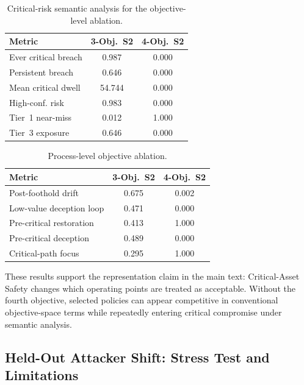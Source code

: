 \documentclass[sigconf,review,anonymous]{acmart}
\begin{document}
\begin{table}[!htbp]
\centering
\caption{Critical-risk semantic analysis for the objective-level ablation.}
\label{tab:app-rq4-objective-semantic-analysis}
\begingroup
\small
\setlength{\tabcolsep}{3pt}
\renewcommand{\arraystretch}{1.10}
\begin{tabular*}{\columnwidth}{@{\extracolsep{\fill}}lcc@{}}
\toprule
Metric & 3-Obj.~S2 & 4-Obj.~S2 \\
\midrule
Ever critical breach & 0.987 & 0.000 \\
Persistent breach & 0.646 & 0.000 \\
Mean critical dwell & 54.744 & 0.000 \\
High-conf. risk & 0.983 & 0.000 \\
Tier~1 near-miss & 0.012 & 1.000 \\
Tier~3 exposure & 0.646 & 0.000 \\
\bottomrule
\end{tabular*}
\endgroup
\end{table}

\begin{table}[!htbp]
\centering
\caption{Process-level objective ablation.}
\label{tab:app-rq4-objective-process-analysis}
\begingroup
\small
\setlength{\tabcolsep}{4pt}
\renewcommand{\arraystretch}{1.10}
\begin{tabular*}{\columnwidth}{@{\extracolsep{\fill}}lcc@{}}
\toprule
Metric & 3-Obj.~S2 & 4-Obj.~S2 \\
\midrule
Post-foothold drift & 0.675 & 0.002 \\
Low-value deception loop & 0.471 & 0.000 \\
Pre-critical restoration & 0.413 & 1.000 \\
Pre-critical deception & 0.489 & 0.000 \\
Critical-path focus & 0.295 & 1.000 \\
\bottomrule
\end{tabular*}
\endgroup
\end{table}

These results support the representation claim in the main text:
Critical-Asset Safety changes which operating points are treated as
acceptable. Without the fourth objective, selected policies can appear
competitive in conventional objective-space terms while repeatedly
entering critical compromise under semantic analysis.

\subsection{Held-Out Attacker Shift: Stress Test and Limitations}
\label{app:attacker-shift}
\end{document}
